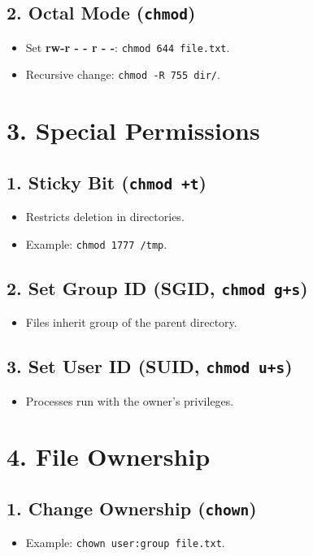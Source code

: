 \documentclass[a4paper]{report}
\begin{document}
\subsection*{2. Octal Mode (\texttt{chmod})}
\begin{itemize}
    \item Set \textbf{rw-r - - r - -}: \texttt{chmod 644 file.txt}.
    \item Recursive change: \texttt{chmod -R 755 dir/}.
\end{itemize}

\section*{3. Special Permissions}

\subsection*{1. Sticky Bit (\texttt{chmod +t})}
\begin{itemize}
    \item Restricts deletion in directories.
    \item Example: \texttt{chmod 1777 /tmp}.
\end{itemize}

\subsection*{2. Set Group ID (SGID, \texttt{chmod g+s})}
\begin{itemize}
    \item Files inherit group of the parent directory.
\end{itemize}

\subsection*{3. Set User ID (SUID, \texttt{chmod u+s})}
\begin{itemize}
    \item Processes run with the owner’s privileges.
\end{itemize}

\section*{4. File Ownership}

\subsection*{1. Change Ownership (\texttt{chown})}
\begin{itemize}
    \item Example: \texttt{chown user:group file.txt}.
\end{itemize}
\end{document}
